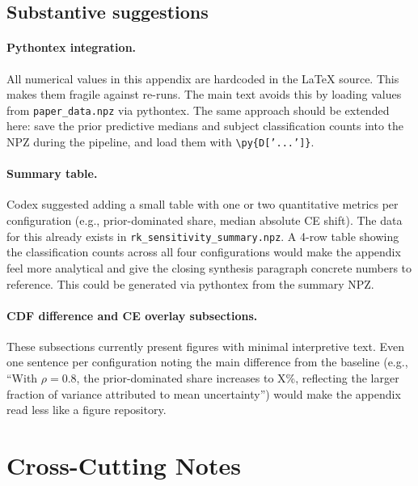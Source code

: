 \documentclass[11pt,a4paper]{article}
\begin{document}
\subsection{Substantive suggestions}

\paragraph{Pythontex integration.}
All numerical values in this appendix are hardcoded in the \LaTeX{}
source. This makes them fragile against re-runs. The main text avoids
this by loading values from \texttt{paper\_data.npz} via pythontex. The
same approach should be extended here: save the prior predictive medians
and subject classification counts into the NPZ during the pipeline, and
load them with \texttt{\textbackslash py\{D['...']\}}.

\paragraph{Summary table.}
Codex suggested adding a small table with one or two quantitative
metrics per configuration (e.g., prior-dominated share, median absolute
CE shift). The data for this already exists in
\texttt{rk\_sensitivity\_summary.npz}. A 4-row table showing the
classification counts across all four configurations would make the
appendix feel more analytical and give the closing synthesis paragraph
concrete numbers to reference. This could be generated via pythontex
from the summary NPZ.

\paragraph{CDF difference and CE overlay subsections.}
These subsections currently present figures with minimal interpretive
text. Even one sentence per configuration noting the main difference
from the baseline (e.g., ``With $\rho = 0.8$, the prior-dominated share
increases to X\%, reflecting the larger fraction of variance attributed
to mean uncertainty'') would make the appendix read less like a figure
repository.


\section{Cross-Cutting Notes}
\end{document}
